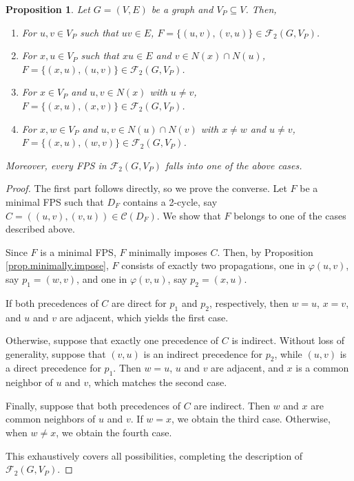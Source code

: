 \documentclass{article}
\newcommand{\FF}{{\mathcal F}}
\newcommand{\CC}{{\mathscr C}}
\newtheorem{proposition}{Proposition}
\begin{document}
\begin{proposition}\label{prop.fps.2-cycles}
Let $G=(V,E)$ be a graph and $V_P \subseteq V$.
Then,
\begin{enumerate}
    \item For $u,v \in V_P$ such that $uv \in E$, $F = \{(u,v),(v,u)\} \in \FF_2(G,V_P)$.
    
    \item For $x,u \in V_P$ such that $xu \in E$ and $v \in N(x) \cap N(u)$, $F = \{(x,u), (u,v)\} \in \FF_2(G,V_P)$.
    
    \item For $x \in V_P$ and $u,v \in N(x)$ with $u \neq v$, $F = \{(x,u), (x,v)\} \in \FF_2(G,V_P)$.
    
    \item For $x,w \in V_P$ and $u,v \in N(u) \cap N(v)$ with $x \neq w$ and $u \neq v$, $F = \{(x,u),(w,v)\}  \in \FF_2(G,V_P)$.
\end{enumerate}
Moreover, every FPS in $\FF_2(G,V_P)$ falls into one of the above cases.
\end{proposition}

\begin{proof}


The first part follows directly, so we prove the converse. 
Let $F$ be a minimal FPS such that $D_F$ contains a 2-cycle, say $C = ((u,v),(v,u)) \in \CC(D_F)$. We show that $F$ belongs to one of the cases described above.

Since $F$ is a minimal FPS, $F$ minimally imposes $C$.
Then, by Proposition \ref{prop.minimally.impose}, $F$ consists of exactly two propagations, one in $\varphi(u,v)$, say $p_1=(w,v)$, and one in $\varphi(v,u)$, say $p_2=(x,u)$.

If both precedences of $C$ are direct for $p_1$ and $p_2$, respectively, then $w = u$, $x = v$, and $u$ and $v$ are adjacent, which yields the first case.

Otherwise, suppose that exactly one precedence of $C$ is indirect. Without loss of generality, suppose that $(v,u)$ is an indirect precedence for $p_2$, while $(u,v)$ is a direct precedence for $p_1$.
Then $w = u$, $u$ and $v$ are adjacent, and $x$ is a common neighbor of $u$ and $v$, which matches the second case.

Finally, suppose that both precedences of $C$ are indirect.
Then $w$ and $x$ are common neighbors of $u$ and $v$.
If $w = x$, we obtain the third case.
Otherwise, when $w \neq x$, we obtain the fourth case.

This exhaustively covers all possibilities, completing the description of $\FF_2(G,V_P)$.
\end{proof}
\end{document}
